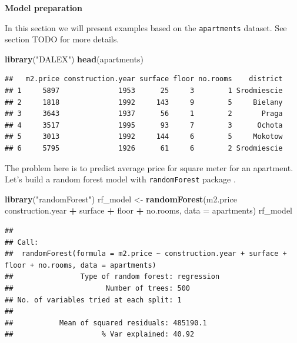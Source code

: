 \documentclass[]{book}
\newenvironment{Shaded}{\begin{snugshade}}{\end{snugshade}}
\newcommand{\DataTypeTok}[1]{\textcolor[rgb]{0.13,0.29,0.53}{#1}}
\newcommand{\KeywordTok}[1]{\textcolor[rgb]{0.13,0.29,0.53}{\textbf{#1}}}
\newcommand{\NormalTok}[1]{#1}
\newcommand{\OperatorTok}[1]{\textcolor[rgb]{0.81,0.36,0.00}{\textbf{#1}}}
\newcommand{\StringTok}[1]{\textcolor[rgb]{0.31,0.60,0.02}{#1}}
\theoremstyle{definition}
\theoremstyle{definition}
\theoremstyle{definition}
\theoremstyle{remark}
\begin{document}
\textbf{Model preparation}

In this section we will present examples based on the
\texttt{apartments} dataset. See section TODO for more details.

\begin{Shaded}
\begin{Highlighting}[]
\KeywordTok{library}\NormalTok{(}\StringTok{"DALEX"}\NormalTok{)}
\KeywordTok{head}\NormalTok{(apartments)}
\end{Highlighting}
\end{Shaded}

\begin{verbatim}
##   m2.price construction.year surface floor no.rooms    district
## 1     5897              1953      25     3        1 Srodmiescie
## 2     1818              1992     143     9        5     Bielany
## 3     3643              1937      56     1        2       Praga
## 4     3517              1995      93     7        3      Ochota
## 5     3013              1992     144     6        5     Mokotow
## 6     5795              1926      61     6        2 Srodmiescie
\end{verbatim}

The problem here is to predict average price for square meter for an
apartment. Let's build a random forest model with \texttt{randomForest}
package \citep{R-randomForest}.

\begin{Shaded}
\begin{Highlighting}[]
\KeywordTok{library}\NormalTok{(}\StringTok{"randomForest"}\NormalTok{)}
\NormalTok{rf_model <-}\StringTok{ }\KeywordTok{randomForest}\NormalTok{(m2.price }\OperatorTok{~}\StringTok{ }\NormalTok{construction.year }\OperatorTok{+}\StringTok{ }\NormalTok{surface }\OperatorTok{+}\StringTok{ }\NormalTok{floor }\OperatorTok{+}
\StringTok{      }\NormalTok{no.rooms, }\DataTypeTok{data =}\NormalTok{ apartments)}
\NormalTok{rf_model}
\end{Highlighting}
\end{Shaded}

\begin{verbatim}
## 
## Call:
##  randomForest(formula = m2.price ~ construction.year + surface +      floor + no.rooms, data = apartments) 
##                Type of random forest: regression
##                      Number of trees: 500
## No. of variables tried at each split: 1
## 
##           Mean of squared residuals: 485190.1
##                     % Var explained: 40.92
\end{verbatim}
\end{document}
